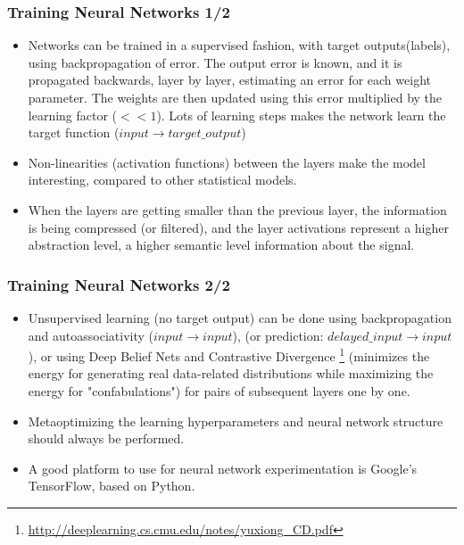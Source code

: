 \documentclass[8pt]{beamer}
\begin{document}
\begin{frame}
\frametitle{Training Neural Networks 1/2}
\begin{itemize}
 \item Networks can be trained in a supervised fashion, with target outputs(labels), using backpropagation of error.
       The output error is known, and it is propagated backwards, layer by layer, estimating an error for each weight parameter.
       The weights are then updated using this error multiplied by the learning factor ($ << 1 $). Lots of learning steps makes
       the network learn the target function ($ input \rightarrow target\_output $)
 \item Non-linearities (activation functions) between the layers make the model interesting, compared to other statistical models.
 \item When the layers are getting smaller than the previous layer, the information is being compressed (or filtered), and the layer
 activations represent a higher abstraction level, a higher semantic level information about the signal.
\end{itemize}
\end{frame}

\begin{frame}
\frametitle{Training Neural Networks 2/2}
\begin{itemize}
 \item Unsupervised learning (no target output) can be done using backpropagation and autoassociativity ($ input \rightarrow input $),
 (or prediction: $ delayed\_input \rightarrow input $), or using Deep Belief Nets and Contrastive Divergence
 \footnote{\href{http://deeplearning.cs.cmu.edu/notes/yuxiong\_CD.pdf}{http://deeplearning.cs.cmu.edu/notes/yuxiong\_CD.pdf}}
 (minimizes the energy
 for generating real data-related distributions while maximizing the energy for "confabulations") for pairs of subsequent layers one by one.
 \item Metaoptimizing the learning hyperparameters and neural network structure should always be performed.
 \item A good platform to use for neural network experimentation is Google's TensorFlow, based on Python.
\end{itemize}


\end{frame}
\end{document}
